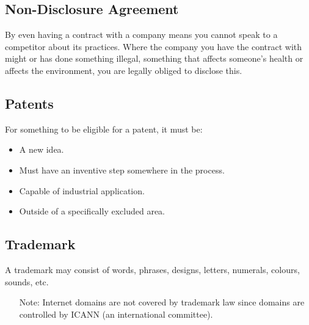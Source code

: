 \subsection{Non-Disclosure Agreement}\label{sub:non_disclosure_agreement}

By even having a contract with a company means you cannot speak to a competitor about its practices.
Where the company you have the contract with might or has done something illegal, something that affects someone's health or affects the environment, you are legally obliged to disclose this.

\subsection{Patents}\label{sub:patents}

For something to be eligible for a patent, it must be:

\begin{itemize}
    \item A new idea.
    \item Must have an inventive step somewhere in the process.
    \item Capable of industrial application.
    \item Outside of a specifically excluded area.
\end{itemize}

\subsection{Trademark}\label{sub:trademark}

A trademark may consist of words, phrases, designs, letters, numerals, colours, sounds, etc.

\begin{note}
    \begin{itemize}
        \item[Note:] Internet domains are not covered by trademark law since domains are controlled by ICANN (an international committee).
    \end{itemize}
\end{note}
